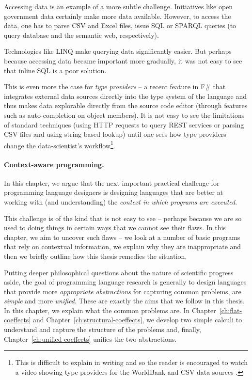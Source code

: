 Accessing data is an example of a more subtle challenge. Initiatives like open government data
certainly make more data available. However, to access the data, one has to parse CSV and Excel files, 
issue SQL or SPARQL queries (to query database and the semantic web, respectively).

Technologies like LINQ \cite{app-linq} make querying data significantly easier. But perhaps 
because accessing data became important more gradually, it was not easy to see that inline
SQL is a poor solution.

This is even more the case for \emph{type providers} -- a recent feature in F\# that integrates
external data sources directly into the type system of the language and thus makes data explorable
directly from the source code editor (through features such as auto-completion on object members).
It is not easy to see the limitations of standard techniques (using HTTP requests to query REST 
services or parsing CSV files and using string-based lookup) until one sees how type providers 
change the data-scientist's workflow\footnote{This is difficult to explain in writing and so the 
reader is encouraged to watch a video showing type providers for the WorldBank and CSV data 
sources \cite{app-fsharp-world}.}.

\paragraph{Context-aware programming.}

In this chapter, we argue that the next important practical challenge for programming language 
designers is designing languages that are better at working with (and understanding) the 
\emph{context in which programs are executed}. 

This challenge is of the kind that is not easy to see -- perhaps because we are so used to 
doing things in certain ways that we cannot see their flaws. In this chapter, we aim to
uncover such flaws -- we look at a number of basic programs that rely on contextual 
information, we explain why they are inappropriate and then we briefly outline how this
thesis remedies the situation.

Putting deeper philosophical questions about the nature of scientific prog\-ress aside,
the goal of programming language research is generally to design languages that provide 
more \emph{appropriate abstractions} for capturing common problems, are \emph{simple} and 
more \emph{unified}. 
These are exactly the aims that we follow in this thesis. In this chapter, we explain what
the common problems are. In Chapter~\ref{ch:flat-coeffects} and Chapter~\ref{ch:structural-coeffects},
we develop two simple calculi to understand and capture the structure of the problems and,
finally, Chapter~\ref{ch:unified-coeffects} unifies the two abstractions.

